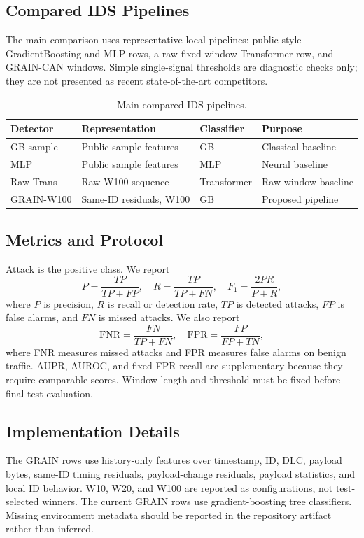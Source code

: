 \documentclass[runningheads]{llncs}
\newcommand{\method}{GRAIN-CAN}
\newcommand{\fpr}{\mathrm{FPR}}
\newcommand{\fnr}{\mathrm{FNR}}
\begin{document}
\subsection{Compared IDS Pipelines}
The main comparison uses representative local pipelines: public-style GradientBoosting and MLP rows, a raw fixed-window Transformer row, and \method{} windows. Simple single-signal thresholds are diagnostic checks only; they are not presented as recent state-of-the-art competitors.

\begin{table}[t]
\caption{Main compared IDS pipelines.}
\label{tab:pipelines}
\centering\small
\setlength{\tabcolsep}{3pt}
\begin{tabular}{llll}
\toprule
Detector & Representation & Classifier & Purpose \\
\midrule
GB-sample & Public sample features & GB & Classical baseline \\
MLP & Public sample features & MLP & Neural baseline \\
Raw-Trans & Raw W100 sequence & Transformer & Raw-window baseline \\
GRAIN-W100 & Same-ID residuals, W100 & GB & Proposed pipeline \\
\bottomrule
\end{tabular}
\end{table}

\subsection{Metrics and Protocol}
Attack is the positive class. We report
\[
P=\frac{TP}{TP+FP},\quad R=\frac{TP}{TP+FN},\quad F_1=\frac{2PR}{P+R},
\]
where $P$ is precision, $R$ is recall or detection rate, $TP$ is detected attacks, $FP$ is false alarms, and $FN$ is missed attacks. We also report
\[
\fnr=\frac{FN}{TP+FN},\quad \fpr=\frac{FP}{FP+TN},
\]
where FNR measures missed attacks and FPR measures false alarms on benign traffic. AUPR, AUROC, and fixed-FPR recall are supplementary because they require comparable scores. Window length and threshold must be fixed before final test evaluation.

\subsection{Implementation Details}
The GRAIN rows use history-only features over timestamp, ID, DLC, payload bytes, same-ID timing residuals, payload-change residuals, payload statistics, and local ID behavior. W10, W20, and W100 are reported as configurations, not test-selected winners. The current GRAIN rows use gradient-boosting tree classifiers. Missing environment metadata should be reported in the repository artifact rather than inferred.
\end{document}
